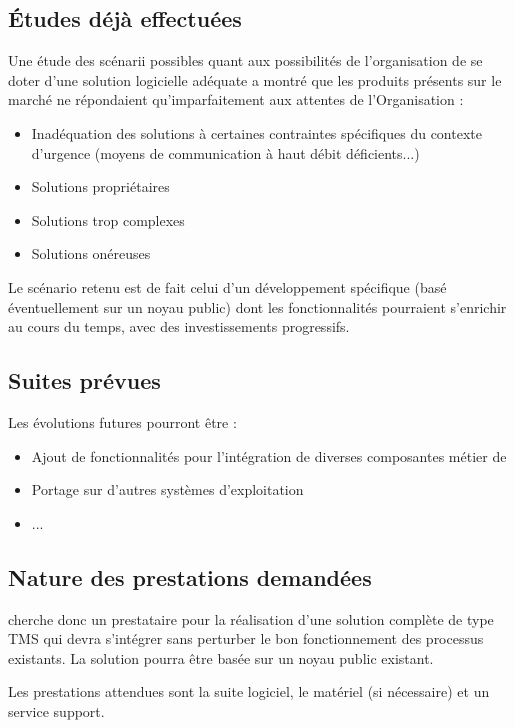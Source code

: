 \subsection{Études déjà effectuées}
Une étude des scénarii possibles quant aux possibilités de l'organisation de se doter d'une solution logicielle adéquate a montré que les produits présents sur le marché ne répondaient qu'imparfaitement aux attentes de l'Organisation :
\begin{itemize}
\item Inadéquation des solutions à certaines contraintes spécifiques du contexte d'urgence (moyens de communication à haut débit déficients...)
\item Solutions propriétaires
\item Solutions trop complexes
\item Solutions onéreuses
\end{itemize}
Le scénario retenu est de fait celui d'un développement spécifique (basé éventuellement sur un noyau public) dont les fonctionnalités pourraient s'enrichir au cours du temps, avec des investissements progressifs.

\subsection{Suites prévues}
Les évolutions futures pourront être :
\begin{itemize}
	\item Ajout de fonctionnalités pour l'intégration de diverses composantes métier de \mo
	\item Portage sur d'autres systèmes d'exploitation
	\item ...
\end{itemize}

\subsection{Nature des prestations demandées}
\mo cherche donc un prestataire pour la réalisation d'une solution complète de type TMS qui devra s'intégrer sans perturber le bon fonctionnement des processus existants. La solution pourra être basée sur un noyau public existant.

Les prestations attendues sont la suite logiciel, le matériel (si nécessaire) et un service support.


